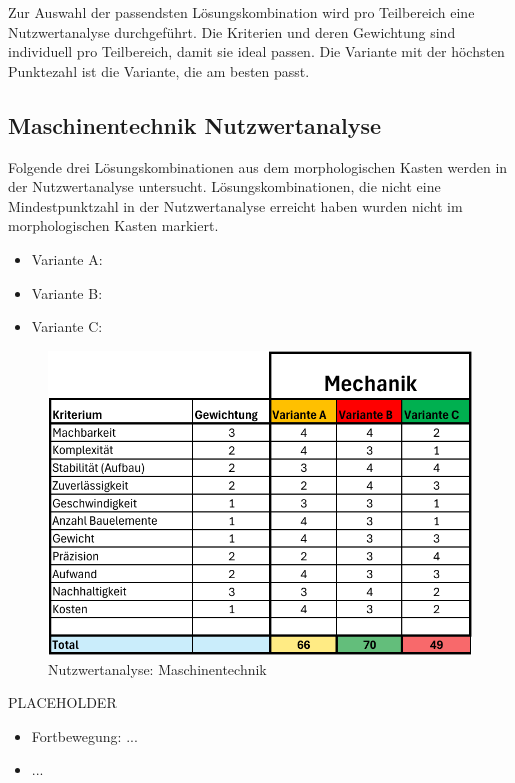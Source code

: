 Zur Auswahl der passendsten Lösungskombination wird pro Teilbereich eine Nutzwertanalyse durchgeführt. Die Kriterien und deren Gewichtung sind individuell pro Teilbereich, damit sie ideal passen. Die Variante mit der höchsten Punktezahl ist die Variante, die am besten passt.

\subsection{Maschinentechnik Nutzwertanalyse}

Folgende drei Lösungskombinationen aus dem morphologischen Kasten werden in der Nutzwertanalyse untersucht. Lösungskombinationen, die nicht eine Mindestpunktzahl in der Nutzwertanalyse erreicht haben wurden nicht im morphologischen Kasten markiert. 

\begin{itemize}
    \item Variante A:
    \item Variante B:
    \item Variante C:
\end{itemize}

\begin{figure}[H]
\centering
\includegraphics[width=\textwidth]{assets/Nutzwertanalyse-M.pdf}
\caption{Nutzwertanalyse: Maschinentechnik}
\label{fig:nutzwert-maschinentechnik}
\end{figure}

PLACEHOLDER

\begin{itemize}
    \item Fortbewegung: ...
    \item ...
\end{itemize}

